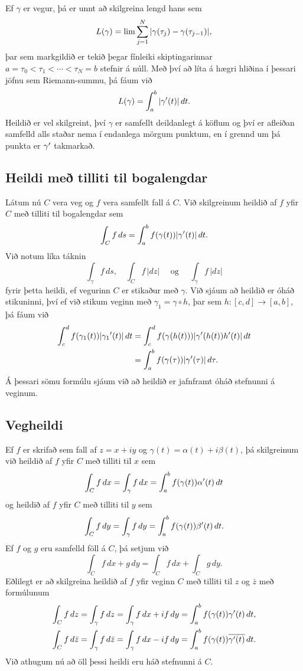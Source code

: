 Ef  $\gamma$ er vegur, þá er unnt að skilgreina lengd
hans sem 
$$
L(\gamma)=\lim \sum_{j=1}\sp N |\gamma(\tau_j)-\gamma(\tau_{j-1})|,
$$
þar sem markgildið er tekið þegar fínleiki skiptingarinnar
$a=\tau_0<\tau_1<\cdots<\tau_N=b$ stefnir á núll.  Með því að líta á
hægri hliðina í þessari jöfnu sem
Riemann-summu, þá fáum við
 $$L(\gamma)=\int_a\sp b |\gamma{\sp{\prime}}(t)| \, dt.
 $$
Heildið er vel skilgreint, því $\gamma$ er samfellt deildanlegt á
köflum  og því er afleiðan samfelld alls staðar nema í endanlega
mörgum punktum, en í grennd um þá punkta er $\gamma{\sp{\prime}}$ takmarkað.  

\subsection*{Heildi með tilliti til bogalengdar}


Látum nú $C$ vera  veg og $f$ vera samfellt fall á $C$.  Við
skilgreinum  heildið af $f$ yfir $C$ með tilliti til
bogalengdar sem 
 $$\int_Cf \, ds = \int_a\sp b f(\gamma(t)) |\gamma{\sp{\prime}}(t)|\, dt.
 $$
Við notum líka táknin
$$\int_\gamma f\, ds,  \quad \int_C f\, |dz| \quad \text { og }
\quad \int_\gamma f\, |dz|
$$
fyrir þetta heildi, ef vegurinn $C$ er stikaður með $\gamma$.  Við
sjáum að heildið er óháð stikuninni, því ef við stikum veginn með
$\gamma_1=\gamma\circ h$, þar sem $h:[c,d]\to [a,b]$, þá  fáum við
\begin{align*}
\int_c\sp d f(\gamma_1(t)) |\gamma_1{\sp{\prime}}(t)|\, dt&=
\int_c\sp d f(\gamma(h(t))) |\gamma{\sp{\prime}}(h(t))h{\sp{\prime}}(t)|\, dt\\
&=
\int_a\sp bf(\gamma(\tau))|\gamma{\sp{\prime}}(\tau)| \, d\tau.
\end{align*}
{Á} þessari sömu formúlu sjáum við að heildið er jafnframt óháð
stefnunni á veginum.  

\subsection*{Vegheildi}

Ef $f$ er skrifað sem fall af $z=x+iy$ og
$\gamma(t)=\alpha(t)+i\beta(t)$, þá skilgreinum við heildið af  $f$
yfir $C$ með tilliti til $x$ sem 
 $$\int_C f \, dx =\int_\gamma f\, dx = \int_a\sp b f(\gamma(t))
\alpha{\sp{\prime}}(t) \, dt
 $$
og heildið af $f$ yfir $C$  með tilliti til $y$ sem
 $$\int_C f \, dy =\int_\gamma f\, dy = \int_a\sp b f(\gamma(t))
\beta{\sp{\prime}}(t) \, dt.
 $$
Ef $f$ og $g$ eru samfelld föll á $C$, þá setjum við 
 $$\int_C f\, dx +g \, dy = \int_C f\, dx + \int_C g\, dy.
 $$
Eðlilegt er að skilgreina heildið af $f$ yfir veginn
$C$ með tilliti til $z$ og $\bar z$ með formúlunum
\begin{gather*}
\int_C f\, dz =\int_\gamma f\, dz= \int_\gamma f\, dx +if\, dy =
\int_a^bf(\gamma(t))\gamma{\sp{\prime}}(t) \, dt,\\
\int_C f\, d\bar z =\int_\gamma f\, d\bar z= \int_\gamma
f\, dx -if\, dy = 
\int_a^bf(\gamma(t))\overline{\gamma{\sp{\prime}}(t)} \, dt.
\end{gather*}
Við athugum nú að öll þessi heildi eru háð stefnunni á $C$.  


